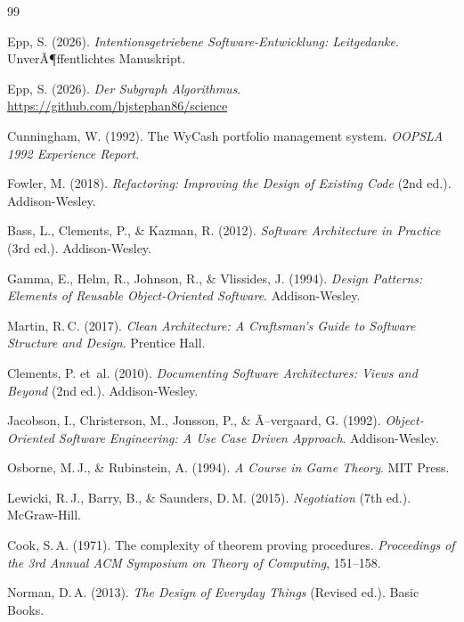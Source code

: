 ﻿\documentclass[a4paper,12pt]{article}
\theoremstyle{definition}
\begin{document}
\begin{thebibliography}{99}

Epp, S. (2026).
\textit{Intentionsgetriebene Software-Entwicklung: Leitgedanke}. UnverÃ¶ffentlichtes Manuskript.

Epp, S. (2026).
\textit{Der Subgraph Algorithmus}.
\url{https://github.com/hjstephan86/science}

Cunningham, W. (1992).
The WyCash portfolio management system.
\textit{OOPSLA 1992 Experience Report}.

Fowler, M. (2018).
\textit{Refactoring: Improving the Design of Existing Code} (2nd ed.).
Addison-Wesley.

Bass, L., Clements, P., \& Kazman, R. (2012).
\textit{Software Architecture in Practice} (3rd ed.).
Addison-Wesley.

Gamma, E., Helm, R., Johnson, R., \& Vlissides, J. (1994).
\textit{Design Patterns: Elements of Reusable Object-Oriented Software}.
Addison-Wesley.

Martin, R.\,C. (2017).
\textit{Clean Architecture: A Craftsman's Guide to Software Structure
and Design}.
Prentice Hall.

Clements, P. et~al. (2010).
\textit{Documenting Software Architectures: Views and Beyond} (2nd ed.).
Addison-Wesley.

Jacobson, I., Christerson, M., Jonsson, P., \& Ã–vergaard, G. (1992).
\textit{Object-Oriented Software Engineering: A Use Case Driven Approach}.
Addison-Wesley.

Osborne, M.\,J., \& Rubinstein, A. (1994).
\textit{A Course in Game Theory}.
MIT Press.

Lewicki, R.\,J., Barry, B., \& Saunders, D.\,M. (2015).
\textit{Negotiation} (7th ed.).
McGraw-Hill.

Cook, S.\,A. (1971).
The complexity of theorem proving procedures.
\textit{Proceedings of the 3rd Annual ACM Symposium on Theory of
Computing}, 151--158.

Norman, D.\,A. (2013).
\textit{The Design of Everyday Things} (Revised ed.).
Basic Books.


\end{thebibliography}
\end{document}
